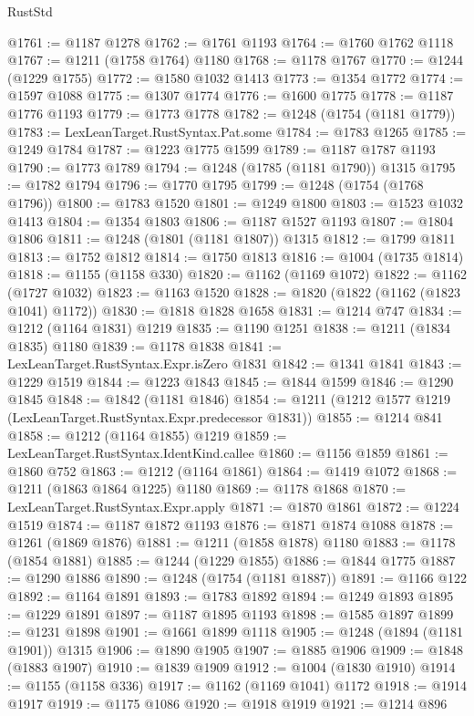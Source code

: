 \begin{lexlean}{RustStd}
\begin{coremodule}
@1761 := @1187 @1278
@1762 := @1761 @1193
@1764 := @1760 @1762 @1118
@1767 := @1211 (@1758 @1764) @1180
@1768 := @1178 @1767
@1770 := @1244 (@1229 @1755)
@1772 := @1580 @1032 @1413
@1773 := @1354 @1772
@1774 := @1597 @1088
@1775 := @1307 @1774
@1776 := @1600 @1775
@1778 := @1187 @1776 @1193
@1779 := @1773 @1778
@1782 := @1248 (@1754 (@1181 @1779))
@1783 := LexLeanTarget.RustSyntax.Pat.some
@1784 := @1783 @1265
@1785 := @1249 @1784
@1787 := @1223 @1775 @1599
@1789 := @1187 @1787 @1193
@1790 := @1773 @1789
@1794 := @1248 (@1785 (@1181 @1790)) @1315
@1795 := @1782 @1794
@1796 := @1770 @1795
@1799 := @1248 (@1754 (@1768 @1796))
@1800 := @1783 @1520
@1801 := @1249 @1800
@1803 := @1523 @1032 @1413
@1804 := @1354 @1803
@1806 := @1187 @1527 @1193
@1807 := @1804 @1806
@1811 := @1248 (@1801 (@1181 @1807)) @1315
@1812 := @1799 @1811
@1813 := @1752 @1812
@1814 := @1750 @1813
@1816 := @1004 (@1735 @1814)
@1818 := @1155 (@1158 @330)
@1820 := @1162 (@1169 @1072)
@1822 := @1162 (@1727 @1032)
@1823 := @1163 @1520
@1828 := @1820 (@1822 (@1162 (@1823 @1041) @1172))
@1830 := @1818 @1828 @1658
@1831 := @1214 @747
@1834 := @1212 (@1164 @1831) @1219
@1835 := @1190 @1251
@1838 := @1211 (@1834 @1835) @1180
@1839 := @1178 @1838
@1841 := LexLeanTarget.RustSyntax.Expr.isZero @1831
@1842 := @1341 @1841
@1843 := @1229 @1519
@1844 := @1223 @1843
@1845 := @1844 @1599
@1846 := @1290 @1845
@1848 := @1842 (@1181 @1846)
@1854 := @1211 (@1212 @1577 @1219 (LexLeanTarget.RustSyntax.Expr.predecessor @1831))
@1855 := @1214 @841
@1858 := @1212 (@1164 @1855) @1219
@1859 := LexLeanTarget.RustSyntax.IdentKind.callee
@1860 := @1156 @1859
@1861 := @1860 @752
@1863 := @1212 (@1164 @1861)
@1864 := @1419 @1072
@1868 := @1211 (@1863 @1864 @1225) @1180
@1869 := @1178 @1868
@1870 := LexLeanTarget.RustSyntax.Expr.apply
@1871 := @1870 @1861
@1872 := @1224 @1519
@1874 := @1187 @1872 @1193
@1876 := @1871 @1874 @1088
@1878 := @1261 (@1869 @1876)
@1881 := @1211 (@1858 @1878) @1180
@1883 := @1178 (@1854 @1881)
@1885 := @1244 (@1229 @1855)
@1886 := @1844 @1775
@1887 := @1290 @1886
@1890 := @1248 (@1754 (@1181 @1887))
@1891 := @1166 @122
@1892 := @1164 @1891
@1893 := @1783 @1892
@1894 := @1249 @1893
@1895 := @1229 @1891
@1897 := @1187 @1895 @1193
@1898 := @1585 @1897
@1899 := @1231 @1898
@1901 := @1661 @1899 @1118
@1905 := @1248 (@1894 (@1181 @1901)) @1315
@1906 := @1890 @1905
@1907 := @1885 @1906
@1909 := @1848 (@1883 @1907)
@1910 := @1839 @1909
@1912 := @1004 (@1830 @1910)
@1914 := @1155 (@1158 @336)
@1917 := @1162 (@1169 @1041) @1172
@1918 := @1914 @1917
@1919 := @1175 @1086
@1920 := @1918 @1919
@1921 := @1214 @896

\end{coremodule}
\end{lexlean}
